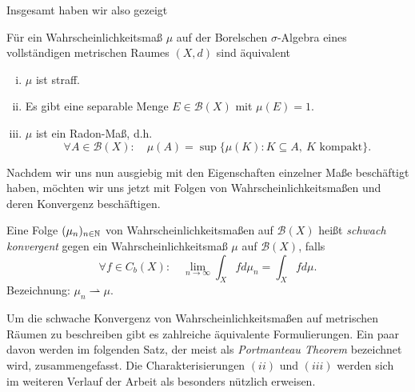 Insgesamt haben wir also gezeigt

\begin{theorem}
    Für ein Wahrscheinlichkeitsmaß $\mu$ auf der Borelschen $\sigma$-Algebra eines vollständigen metrischen Raumes $(X,d)$ sind äquivalent
    \begin{enumerate}[(i)]
        \item $\mu$ ist straff.
        \item Es gibt eine separable Menge $E \in \mathcal{B}(X)$ mit $\mu(E) = 1$.
        \item $\mu$ ist ein Radon-Maß, d.h.
        $$
        \forall A \in \mathcal{B}(X): \quad \mu(A) = \sup\{\mu(K): K \subseteq A, \ K \text{ kompakt}\}.
        $$   
    \end{enumerate}
\end{theorem}

Nachdem wir uns nun ausgiebig mit den Eigenschaften einzelner Maße beschäftigt haben, möchten wir uns jetzt mit Folgen von Wahrscheinlichkeitsmaßen und deren Konvergenz beschäftigen. 

\begin{mydef}
    Eine Folge $(\mu_n)_{n \in \mathbb{N}}$ von Wahrscheinlichkeitsmaßen auf $\mathcal{B}(X)$ heißt \textit{schwach konvergent} 
    gegen ein Wahrscheinlichkeitsmaß $\mu$ auf $\mathcal{B}(X)$, falls 
    $$
        \forall f \in C_b(X): \quad \lim_{n \to \infty} \int_Xfd\mu_n = \int_X fd\mu . 
    $$
    Bezeichnung: $\mu_n \rightharpoonup \mu$. 
\end{mydef}

Um die schwache Konvergenz von Wahrscheinlichkeitsmaßen auf metrischen Räumen zu beschreiben gibt es zahlreiche äquivalente Formulierungen. 
Ein paar davon werden im folgenden Satz, der meist als \textit{Portmanteau Theorem} bezeichnet wird, zusammengefasst. 
Die Charakterisierungen $(ii)$ und $(iii)$ werden sich im weiteren Verlauf der Arbeit als besonders nützlich erweisen. 

